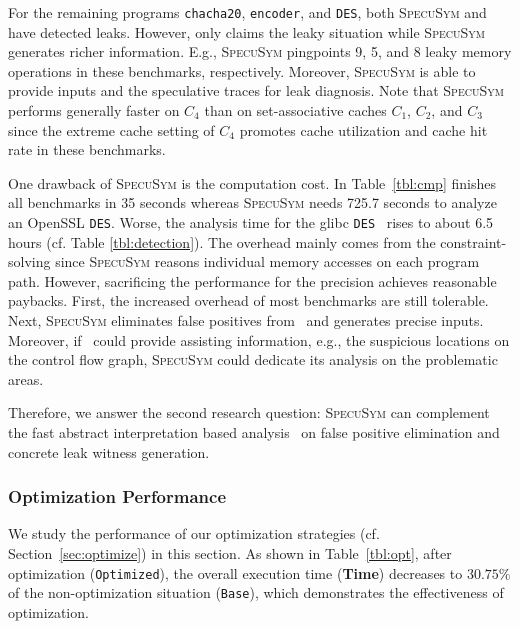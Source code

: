 \documentclass[sigconf]{acmart}
\newcommand{\SpecuSym}{\textsc{SpecuSym} }
\begin{document}
For the remaining programs \texttt{chacha20}, \texttt{encoder}, and \texttt{DES}, 
both \SpecuSym and~\cite{WuW19} have detected leaks. However, \cite{WuW19} only 
claims the leaky situation while \SpecuSym generates richer information. E.g., 
\SpecuSym pingpoints 9, 5, and 8 leaky memory operations in these benchmarks, 
respectively. Moreover, \SpecuSym is able to provide inputs and the speculative 
traces for leak diagnosis.
Note that \SpecuSym performs generally faster on $C_4$ than on set-associative 
caches $C_1$, $C_2$, and $C_3$ since the extreme cache setting of $C_4$
promotes cache utilization and cache hit rate in these benchmarks. 




One drawback of \SpecuSym is the computation cost. In Table~\ref{tbl:cmp}
\cite{WuW19} finishes all benchmarks in 35 seconds whereas \SpecuSym needs 
725.7 seconds to analyze an OpenSSL \texttt{DES}. Worse, the analysis time 
for the glibc \texttt{DES}~\cite{glibc} rises to about 6.5 hours (cf. Table
\ref{tbl:detection}). The overhead mainly comes from the constraint-solving 
since \SpecuSym reasons individual memory accesses on each program path. 
However, sacrificing the performance for the precision achieves reasonable 
paybacks. First, the increased overhead of most benchmarks are still tolerable.
Next, \SpecuSym eliminates false positives from~\cite{WuW19} and generates 
precise inputs. Moreover, if~\cite{WuW19} could provide assisting information, 
e.g., the suspicious locations on the control flow graph, \SpecuSym could dedicate 
its analysis on the problematic areas. 


Therefore, we answer the second research question: \SpecuSym can complement 
the fast abstract interpretation based analysis~\cite{WuW19} on false positive 
elimination and concrete leak witness generation.


\subsubsection{Optimization Performance}
\label{sec:opt_perform}
We study the performance of our optimization strategies (cf. Section~\ref{sec:optimize})
in this section. As shown in Table~\ref{tbl:opt}, after optimization (\texttt{Optimized}), 
the overall execution time (\textbf{Time}) decreases to $30.75\%$ of the non-optimization 
situation (\texttt{Base}), which demonstrates the effectiveness of optimization. 
\end{document}
